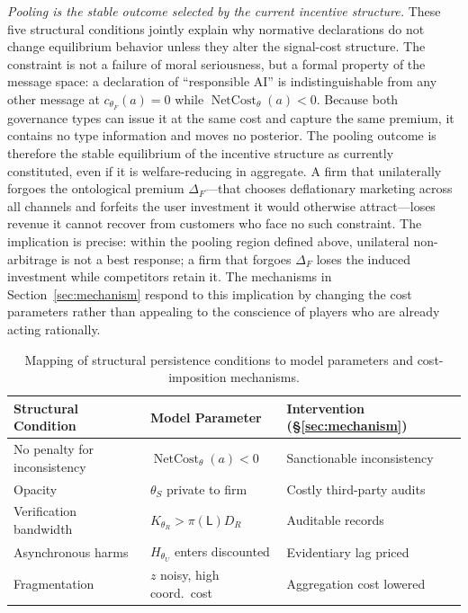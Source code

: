 \documentclass[review,authoryear]{elsarticle}
\theoremstyle{definition}
\theoremstyle{plain}
\begin{document}
\emph{Pooling is the stable outcome selected by the current incentive structure.} These five structural conditions jointly explain why normative declarations do not change equilibrium behavior unless they alter the signal-cost structure. The constraint is not a failure of moral seriousness, but a formal property of the message space: a declaration of ``responsible AI'' is indistinguishable from any other message at $c_{\theta_F}(a)=0$ while $\operatorname{NetCost}_{\theta}(a)<0$. Because both governance types can issue it at the same cost and capture the same premium, it contains no type information and moves no posterior. The pooling outcome is therefore the stable equilibrium of the incentive structure as currently constituted, even if it is welfare-reducing in aggregate. A firm that unilaterally forgoes the ontological premium $\Delta_F$---that chooses deflationary marketing across all channels and forfeits the user investment it would otherwise attract---loses revenue it cannot recover from customers who face no such constraint. The implication is precise: within the pooling region defined above, unilateral non-arbitrage is not a best response; a firm that forgoes $\Delta_F$ loses the induced investment while competitors retain it. The mechanisms in Section~\ref{sec:mechanism} respond to this implication by changing the cost parameters rather than appealing to the conscience of players who are already acting rationally.

\begin{table}[ht]
\centering
\small
\setlength{\tabcolsep}{4pt}
\begin{tabular}{@{}lll@{}}
\toprule
\textbf{Structural Condition} & \textbf{Model Parameter} & \textbf{Intervention (\S\ref{sec:mechanism})} \\
\midrule
No penalty for inconsistency & $\operatorname{NetCost}_{\theta}(a)<0$ & Sanctionable inconsistency \\
Opacity & $\theta_S$ private to firm & Costly third-party audits \\
Verification bandwidth & $K_{\theta_R}>\pi(\mathsf{L})D_R$ & Auditable records \\
Asynchronous harms & $H_{\theta_U}$ enters discounted & Evidentiary lag priced \\
Fragmentation & $z$ noisy, high coord.\ cost & Aggregation cost lowered \\
\bottomrule
\end{tabular}
\caption{Mapping of structural persistence conditions to model parameters and cost-imposition mechanisms.}
\label{tab:condition-map}
\end{table}
\end{document}
